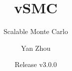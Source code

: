 \title{vSMC}
\subtitle{Scalable Monte Carlo}
\author{Yan Zhou}
\date{Release v3.0.0}
\maketitle
\tableofcontents
\listoftables
